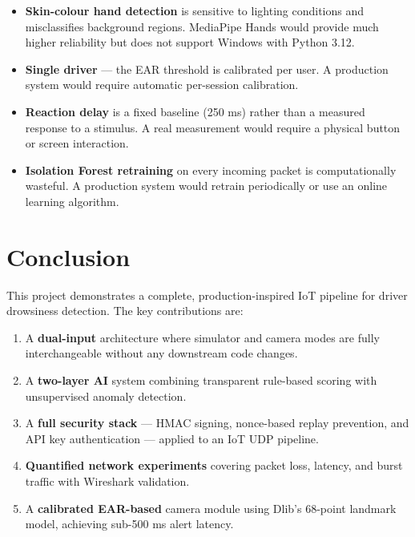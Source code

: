 \documentclass[12pt, a4paper]{article}
\begin{document}
\begin{itemize}
    \item \textbf{Skin-colour hand detection} is sensitive to lighting conditions
          and misclassifies background regions. MediaPipe Hands would provide
          much higher reliability but does not support Windows with Python 3.12.
    \item \textbf{Single driver} — the EAR threshold is calibrated per user.
          A production system would require automatic per-session calibration.
    \item \textbf{Reaction delay} is a fixed baseline (250 ms) rather than a
          measured response to a stimulus. A real measurement would require
          a physical button or screen interaction.
    \item \textbf{Isolation Forest retraining} on every incoming packet is
          computationally wasteful. A production system would retrain
          periodically or use an online learning algorithm.
\end{itemize}
\newpage
\section{Conclusion}
\label{sec:conclusion}

This project demonstrates a complete, production-inspired IoT pipeline for
driver drowsiness detection. The key contributions are:

\begin{enumerate}
    \item A \textbf{dual-input} architecture where simulator and camera modes
          are fully interchangeable without any downstream code changes.
    \item A \textbf{two-layer AI} system combining transparent rule-based
          scoring with unsupervised anomaly detection.
    \item A \textbf{full security stack} — HMAC signing, nonce-based replay
          prevention, and API key authentication — applied to an IoT UDP pipeline.
    \item \textbf{Quantified network experiments} covering packet loss,
          latency, and burst traffic with Wireshark validation.
    \item A \textbf{calibrated EAR-based} camera module using Dlib's 68-point
          landmark model, achieving sub-500 ms alert latency.
\end{enumerate}
\end{document}
